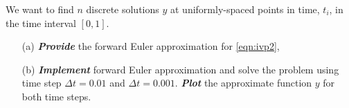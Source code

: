 \documentclass[11pt,a4paper]{article}
\newcommand{\bfit}[1]{\textit{\textbf{#1}}}
\begin{document}
\begin{enumerate}
We want to find $n$ discrete solutions $y$ at uniformly-spaced points in time, $t_i$, in the time interval $\left[0,1\right]$. 

\begin{itemize}
\item[(a)] \bfit{Provide} the forward Euler approximation for \eqref{eqn:ivp2},
\item[(b)] \bfit{Implement} forward Euler approximation and solve the problem using time step $\Delta t = 0.01$ and $\Delta t = 0.001$. \bfit{Plot} the approximate function $y$ for both time steps. 
\end{itemize}

\end{enumerate}
\end{document}
